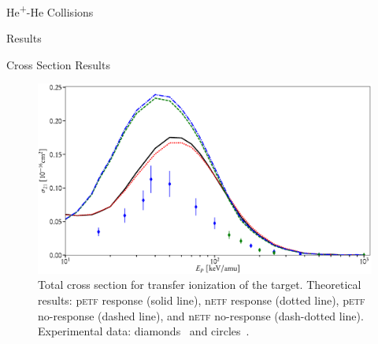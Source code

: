 \documentclass[letterpaper, 11 pt]{report}
\begin{document}
\begin{chapter}{\texorpdfstring{He\textsuperscript{+}}{He+}-He Collisions \label{chap:hephe}}
\begin{section}{Results \label{sec:hephe-disc}}
\begin{subsection}{Cross Section Results \label{sec:hephe-res}}
         \begin{figure}[t]
            \centering
            \includegraphics[width = \linewidth]{./images/hephe-cross/HepHe-021.eps}
            \caption[Total cross section for transfer ionization of the target in
                     He\textsuperscript{+}-He collisions.]
                     {Total cross section for transfer ionization of the target.
                     Theoretical results: p\textsc{etf} response (solid line), n\textsc{etf} response
                                          (dotted line), p\textsc{etf} no-response (dashed line), and
                                          n\textsc{etf} no-response (dash-dotted line).
                     Experimental data: diamonds~\cite{Dub-89} and circles~\cite{FTFHLP-95}.
                     \label{fig:cs021}}
         \end{figure}


\end{subsection}
\end{section}
\end{chapter}
\end{document}
